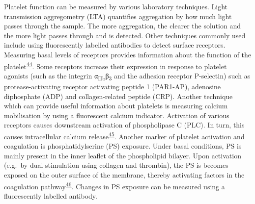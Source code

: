 \documentclass[11pt,twoside]{bristolthesis}
\begin{document}
Platelet function can be measured by various laboratory techniques. Light transmission aggregometry (LTA) quantifies aggregation by how much light passes through the sample. The more aggregation, the clearer the solution and the more light passes through and is detected. Other techniques commonly used include using fluorescently labelled antibodies to detect surface receptors. Measuring basal levels of receptors provides information about the function of the platelet\textsuperscript{\protect\hyperlink{ref-Hu2017}{44}}. Some receptors increase their expression in response to platelet agonists (such as the integrin α\textsubscript{IIb}β\textsubscript{3} and the adhesion receptor P-selectin) such as protease-activating receptor activating peptide 1 (PAR1-AP), adenosine diphosphate (ADP) and collagen-related peptide (CRP). Another technique which can provide useful information about platelets is measuring calcium mobilisation by using a fluorescent calcium indicator. Activation of various receptors causes downstream activation of phospholipase C (PLC). In turn, this causes intracellular calcium release\textsuperscript{\protect\hyperlink{ref-Varga-Szabo2009}{45}}. Another marker of platelet activation and coagulation is phosphatidylserine (PS) exposure. Under basal conditions, PS is mainly present in the inner leaflet of the phospholipid bilayer. Upon activation (e.g.~by dual stimulation using collagen and thrombin), the PS is becomes exposed on the outer surface of the membrane, thereby activating factors in the coagulation pathway\textsuperscript{\protect\hyperlink{ref-Bevers1983}{46}}. Changes in PS exposure can be measured using a fluorescently labelled antibody.
\end{document}
